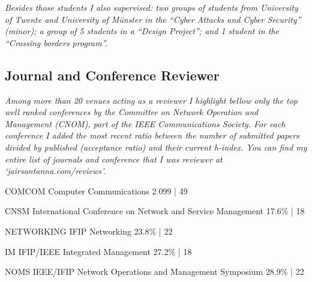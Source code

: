 \documentclass[print]{styles/friggeri-cv-linux} %
\begin{document}
\vspace{-0.3cm}
\textit{Besides those students I also supervised: two groups of students from University of
Twente and University of Münster in the ``Cyber Attacks and Cyber Security''
(minor); a group of 5 students in a ``Design Project''; and 1 student in the
``Crossing borders program''.}


\subsection{Journal and Conference Reviewer}\vspace{-5pt}

\textit{Among more than 20 venues acting as a reviewer I highlight bellow only
the top well ranked conferences by the Committee on Network Operation and
Management (CNOM), part of the IEEE Communications Society. For each conference
I added the most recent ratio between the number of submitted papers divided by
published (acceptance ratio) and their current h-index. You can find my entire
list of journals and conference that I was reviewer at
`jairsantanna.com/reviews'}.

\begin{entrylist}
\vspace{-0.3cm}
\entry
{COMCOM} %
{Computer Communications}
{2.099 | 49}

\vspace{-0.3cm}
\entry
{CNSM} %
{International Conference on Network and Service Management}
{17.6\% | 18}

\vspace{-0.3cm}
\entry
{NETWORKING} %
{IFIP Networking}
{23.8\% | 22 }

\vspace{-0.3cm}
\entry
{IM} %
{IFIP/IEEE Integrated Management}
{27.2\% | 18}

\vspace{-0.3cm}
\entry
{NOMS} %
{IEEE/IFIP Network Operations and Management Symposium }
{28.9\% | 22}

\end{entrylist}
\end{document}
